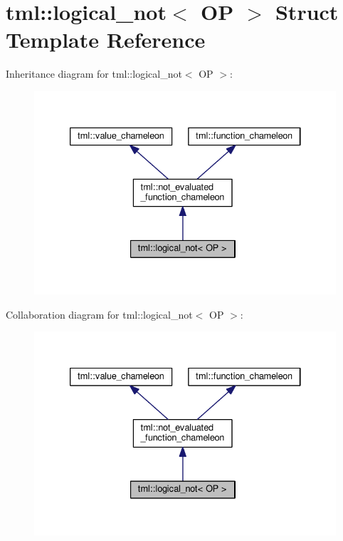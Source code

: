 \hypertarget{structtml_1_1logical__not}{\section{tml\+:\+:logical\+\_\+not$<$ O\+P $>$ Struct Template Reference}
\label{structtml_1_1logical__not}
}


Inheritance diagram for tml\+:\+:logical\+\_\+not$<$ O\+P $>$\+:
\nopagebreak
\begin{figure}[H]
\begin{center}
\leavevmode
\includegraphics[width=333pt]{structtml_1_1logical__not__inherit__graph}
\end{center}
\end{figure}


Collaboration diagram for tml\+:\+:logical\+\_\+not$<$ O\+P $>$\+:
\nopagebreak
\begin{figure}[H]
\begin{center}
\leavevmode
\includegraphics[width=333pt]{structtml_1_1logical__not__coll__graph}
\end{center}
\end{figure}
